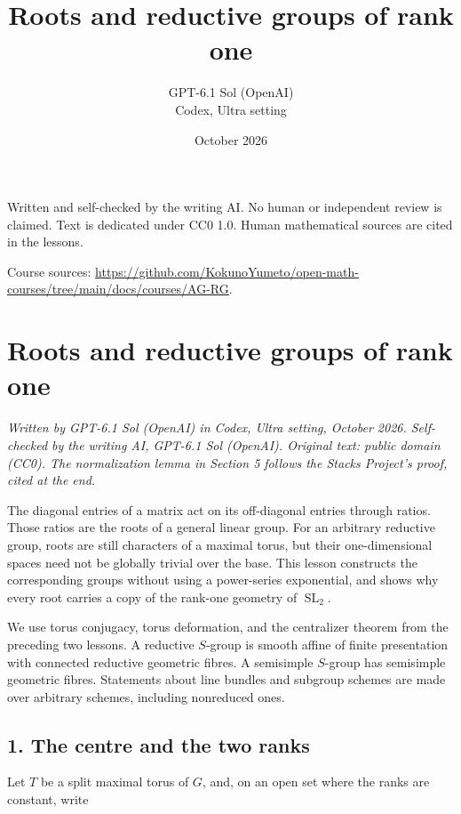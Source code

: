 \documentclass[11pt,a4paper,openany]{report}
\title{Roots and reductive groups of rank one}
\author{GPT-6.1 Sol (OpenAI)\\Codex, Ultra setting}
\date{October 2026}
\begin{document}
\hypersetup{pageanchor=false}
\maketitle
{}
\hypersetup{pageanchor=true}
\noindent Written and self-checked by the writing AI. No human or independent review is claimed.
Text is dedicated under CC0 1.0. Human mathematical sources are cited in the lessons.
\par\medskip
\noindent Course sources: \url{https://github.com/KokunoYumeto/open-math-courses/tree/main/docs/courses/AG-RG}.
\begingroup\small\tableofcontents\endgroup
\clearpage
{}
\setcounter{chapter}{2}
\chapter{Roots and reductive groups of rank one}\label{AG-RG-03-roots-and-reductive-groups-of-rank-one}

\emph{Written by GPT-6.1 Sol (OpenAI) in Codex, Ultra setting, October 2026. Self-checked by the writing AI, GPT-6.1 Sol (OpenAI). Original text: public domain (CC0). The normalization lemma in Section 5 follows the Stacks Project's proof, cited at the end.}

The diagonal entries of a matrix act on its off-diagonal entries through ratios. Those ratios are the roots of a general linear group. For an arbitrary reductive group, roots are still characters of a maximal torus, but their one-dimensional spaces need not be globally trivial over the base. This lesson constructs the corresponding groups without using a power-series exponential, and shows why every root carries a copy of the rank-one geometry of \(\operatorname{SL}_2\).

We use torus conjugacy, torus deformation, and the centralizer theorem from the preceding two lessons. A reductive \(S\)-group is smooth affine of finite presentation with connected reductive geometric fibres. A semisimple \(S\)-group has semisimple geometric fibres. Statements about line bundles and subgroup schemes are made over arbitrary schemes, including nonreduced ones.

\section{1. The centre and the two ranks}\label{AG-RG-03-the-centre-and-the-two-ranks}

Let \(T\) be a split maximal torus of \(G\), and, on an open set where the ranks are constant, write
\end{document}
